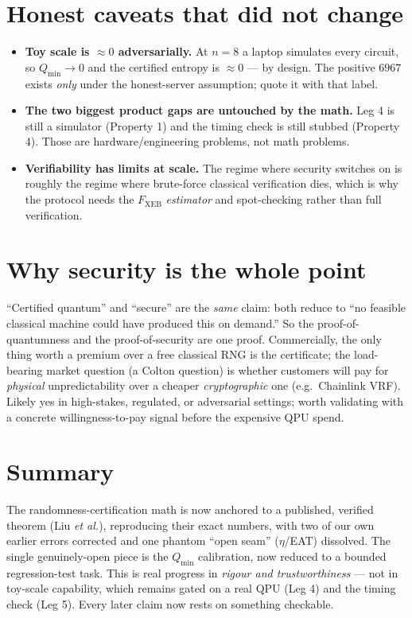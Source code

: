 \documentclass[11pt]{article}
\theoremstyle{definition}
\theoremstyle{plain}
\newcommand{\Fxeb}{F_{\mathrm{XEB}}}
\newcommand{\Qmin}{Q_{\min}}
\begin{document}
\section{Honest caveats that did not change}
\begin{warnbox}
\begin{itemize}[leftmargin=1.4em,itemsep=2pt]
\item \textbf{Toy scale is $\approx0$ adversarially.} At $n=8$ a laptop simulates every
circuit, so $\Qmin\to0$ and the certified entropy is $\approx0$ --- by design. The positive
$6967$ exists \emph{only} under the honest-server assumption; quote it with that label.
\item \textbf{The two biggest product gaps are untouched by the math.} Leg 4 is still a
simulator (Property 1) and the timing check is still stubbed (Property 4). Those are
hardware/engineering problems, not math problems.
\item \textbf{Verifiability has limits at scale.} The regime where security switches on is
roughly the regime where brute-force classical verification dies, which is why the protocol
needs the $\Fxeb$ \emph{estimator} and spot-checking rather than full verification.
\end{itemize}
\end{warnbox}

\section{Why security is the whole point}
``Certified quantum'' and ``secure'' are the \emph{same} claim: both reduce to ``no feasible
classical machine could have produced this on demand.'' So the proof-of-quantumness and the
proof-of-security are one proof. Commercially, the only thing worth a premium over a free
classical RNG is the certificate; the load-bearing market question (a Colton question) is
whether customers will pay for \emph{physical} unpredictability over a cheaper
\emph{cryptographic} one (e.g.\ Chainlink VRF). Likely yes in high-stakes, regulated, or
adversarial settings; worth validating with a concrete willingness-to-pay signal before the
expensive QPU spend.

\section{Summary}
\begin{keybox}
The randomness-certification math is now anchored to a published, verified theorem (Liu
\emph{et al.}), reproducing their exact numbers, with two of our own earlier errors corrected
and one phantom ``open seam'' ($\eta$/EAT) dissolved. The single genuinely-open piece is the
$\Qmin$ calibration, now reduced to a bounded regression-test task. This is real progress in
\emph{rigour and trustworthiness} --- not in toy-scale capability, which remains gated on a
real QPU (Leg 4) and the timing check (Leg 5). Every later claim now rests on something
checkable.
\end{keybox}
\end{document}
